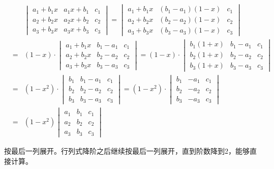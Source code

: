 \item[(2)]
\begin{eqnarray*}
& & \begin{vmatrix} a_1 + b_1x & a_1x + b_1 & c_1 \\ a_2 + b_2x & a_2x + b_2 & c_2 \\ a_3 + b_3x & a_3x + b_3 & c_3 \end{vmatrix} = \begin{vmatrix} a_1 + b_1x & (b_1 - a_1)(1 - x) & c_1 \\ a_2 + b_2x & (b_2 - a_2)(1 - x) & c_2 \\ a_3 + b_3x & (b_3 - a_3)(1 - x) & c_3 \end{vmatrix} \\
& = & (1 - x)\cdot\begin{vmatrix} a_1 + b_1x & b_1 - a_1 & c_1 \\ a_2 + b_2x & b_2 - a_2 & c_2 \\ a_3 + b_3x & b_3 - a_3 & c_3 \end{vmatrix} = (1 - x)\cdot\begin{vmatrix} b_1(1+x) & b_1 - a_1 & c_1 \\ b_2(1+x) & b_2 - a_2 & c_2 \\ b_3(1+x) & b_3 - a_3 & c_3 \end{vmatrix} \\
& = & (1 - x^2)\cdot\begin{vmatrix} b_1 & b_1 - a_1 & c_1 \\ b_2 & b_2 - a_2 & c_2 \\ b_3 & b_3 - a_3 & c_3 \end{vmatrix} = (1 - x^2)\cdot\begin{vmatrix} b_1 & -a_1 & c_1 \\ b_2 & -a_2 & c_2 \\ b_3 & -a_3 & c_3 \end{vmatrix}\\
& = & (1 - x^2)\begin{vmatrix} a_1 & b_1 & c_1 \\ a_2 & b_2 & c_2 \\ a_3 & b_3 & c_3 \end{vmatrix}
\end{eqnarray*}

\item[(3)] 按最后一列展开。行列式降阶之后继续按最后一列展开，直到阶数降到2，能够直接计算。

